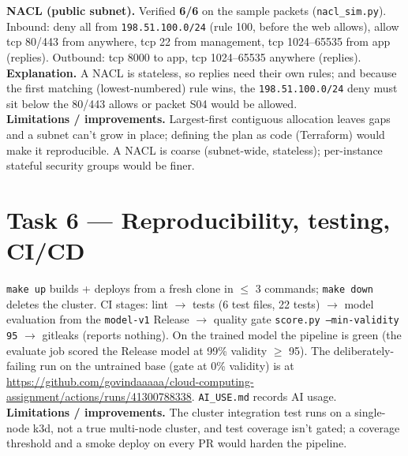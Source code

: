 \documentclass[10pt,a4paper]{article}
\newcommand{\code}[1]{\texttt{\small #1}}
\begin{document}
\noindent\textbf{NACL (public subnet).} Verified \textbf{6/6} on the sample packets (\code{nacl\_sim.py}).
Inbound: deny all from \code{198.51.100.0/24} (rule 100, before the web allows), allow tcp 80/443 from
anywhere, tcp 22 from management, tcp 1024--65535 from app (replies). Outbound: tcp 8000 to app, tcp
1024--65535 anywhere (replies). \textbf{Explanation.} A NACL is stateless, so replies need their own rules;
and because the first matching (lowest-numbered) rule wins, the \code{198.51.100.0/24} deny must sit below
the 80/443 allows or packet S04 would be allowed.\\
\textbf{Limitations / improvements.} Largest-first contiguous allocation leaves gaps and a subnet can't grow
in place; defining the plan as code (Terraform) would make it reproducible. A NACL is coarse (subnet-wide,
stateless); per-instance stateful security groups would be finer.

\section{Task 6 --- Reproducibility, testing, CI/CD}
\code{make up} builds + deploys from a fresh clone in $\leq$ 3 commands; \code{make down} deletes the
cluster. CI stages: lint $\rightarrow$ tests (6 test files, 22 tests) $\rightarrow$ model evaluation from the
\code{model-v1} Release $\rightarrow$ quality gate \code{score.py --min-validity 95} $\rightarrow$ gitleaks
(reports nothing). On the trained model the pipeline is green (the evaluate job scored the Release model at
99\% validity $\geq$ 95). The deliberately-failing run on the untrained base (gate at 0\% validity) is at
\url{https://github.com/govindaaaaa/cloud-computing-assignment/actions/runs/41300788338}. \code{AI\_USE.md}
records AI usage.\\
\textbf{Limitations / improvements.} The cluster integration test runs on a single-node k3d, not a true
multi-node cluster, and test coverage isn't gated; a coverage threshold and a smoke deploy on every PR would
harden the pipeline.
\end{document}
